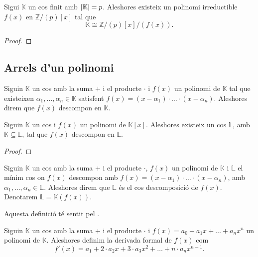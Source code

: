 \documentclass[../../Main.tex]{subfiles}
\begin{document}
	\begin{theorem}
		Sigui \(\mathbb{K}\) un cos finit amb \(\abs{\mathbb{K}}=p\). Aleshores existeix un polinomi irreductible \(f(x)\) en \(\mathbb{Z}/(p)[x]\) tal que
		\[\mathbb{K}\cong\mathbb{Z}/(p)[x]/(f(x)).\]
		\begin{proof}
		\end{proof}
	\end{theorem}
	\subsection{Arrels d'un polinomi}
	\begin{definition}
		\label{def:descomposició d'un polinomi}
		Siguin \(\mathbb{K}\) un cos amb la suma \(+\) i el producte \(\cdot\) i \(f(x)\) un polinomi de \(\mathbb{K}\) tal que existeixen \(\alpha_{1},\dots,\alpha_{n}\in\mathbb{K}\) satisfent \(f(x)=(x-\alpha_{1})\cdot\ldots\cdot(x-\alpha_{n})\). Aleshores direm que \(f(x)\) descompon en \(\mathbb{K}\).
	\end{definition}
	\begin{theorem}
		\label{thm:Teorema de Kronecker}
		Siguin \(\mathbb{K}\) un cos i \(f(x)\) un polinomi de \(\mathbb{K}[x]\). Aleshores existeix un cos \(\mathbb{L}\), amb \(\mathbb{K}\subseteq\mathbb{L}\), tal que \(f(x)\) descompon en \(\mathbb{L}\).
		\begin{proof}
		\end{proof}
	\end{theorem}
	\begin{definition}
		\label{def:cos de descomposició d'un polinomi}
		Siguin \(\mathbb{K}\) un cos amb la suma \(+\) i el producte \(\cdot\), \(f(x)\) un polinomi de \(\mathbb{K}\) i \(\mathbb{L}\) el mínim cos on \(f(x)\) descompon amb \(f(x)=(x-\alpha_{1})\cdot\ldots\cdot(x-\alpha_{n})\), amb \(\alpha_{1},\dots,\alpha_{n}\in\mathbb{L}\). Aleshores direm que \(\mathbb{L}\) és el cos descomposició de \(f(x)\). Denotarem \(\mathbb{L}=\mathbb{K}(f(x))\).
		
		Aquesta definició té sentit pel .
	\end{definition}
	\begin{definition}
		\label{def:derivada formal}
		Siguin \(\mathbb{K}\) un cos amb la suma \(+\) i el producte \(\cdot\) i \(f(x)=a_{0}+a_{1}x+\dots+a_{n}x^{n}\) un polinomi de \(\mathbb{K}\). Aleshores definim la derivada formal de \(f(x)\) com
		\[f'(x)=a_{1}+2\cdot a_{2}x+3\cdot a_{3}x^{2}+\dots+n\cdot a_{n}x^{n-1}.\]
	\end{definition}
\end{document}
